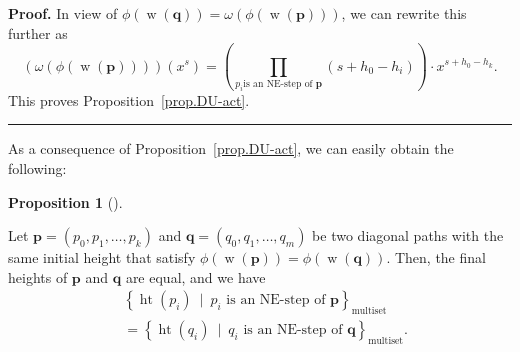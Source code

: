 \documentclass[numbers=enddot,12pt,final,onecolumn,notitlepage]{scrartcl}%
\theoremstyle{definition}
\newtheorem{prop}[theo]{Proposition}
\newenvironment{proposition}[1][]
{\begin{prop}[#1]\begin{leftbar}}
{\end{leftbar}\end{prop}}
\newenvironment{proof}[1][Proof]{\noindent\textbf{#1.} }{\ \rule{0.5em}{0.5em}}
\newcommand{\pp}{\mathbf{p}}
\newcommand{\qq}{\mathbf{q}}
\newcommand{\w}{\operatorname{w}}
\newcommand{\htt}{\operatorname{ht}}
\newcommand{\multiset}{\operatorname{multiset}}
\newenvironment{verlong}{}{}
\begin{document}
\begin{verlong}
\begin{proof}
In view of $\phi\left(  \w\left(  \qq\right)  \right)
=\omega\left(  \phi\left(  \w\left(  \pp\right)
\right)  \right)  $, we can rewrite this further as%
\[
\left(  \omega\left(  \phi\left(  \w\left(  \pp\right)
\right)  \right)  \right)  \left(  x^{s}\right)  =\left(  \prod_{p_{i}\text{
is an NE-step of }\pp}\left(  s+h_{0}-h_{i}\right)  \right)  \cdot
x^{s+h_{0}-h_{k}}.
\]
This proves Proposition~\ref{prop.DU-act}.
\end{proof}
\end{verlong}

As a consequence of Proposition~\ref{prop.DU-act}, we can easily obtain the following:

\begin{proposition}
\label{prop.DU-eqlett} Let $\pp=\left(  p_{0},p_{1},\ldots
,p_{k}\right)  $ and $\qq=\left(  q_{0},q_{1},\ldots,q_{m}\right)  $ be
two diagonal paths with the same initial height that satisfy $\phi\left(
\w\left(  \pp\right)  \right)  =\phi\left(
\w\left(  \qq\right)  \right)  $. Then, the final heights
of $\pp$ and $\qq$ are equal, and we have
\begin{align}
&  \left\{  \htt\left(  p_{i}\right)  \ \mid\ p_{i}\text{ is an
NE-step of }\pp\right\}  _{\multiset} \nonumber \\
&  =\left\{  \htt\left(  q_{i}\right)  \ \mid\ q_{i}\text{ is an
NE-step of }\qq\right\}  _{\multiset}.\label{eq:equality_step_heights}
\end{align}

\end{proposition}
\end{document}
